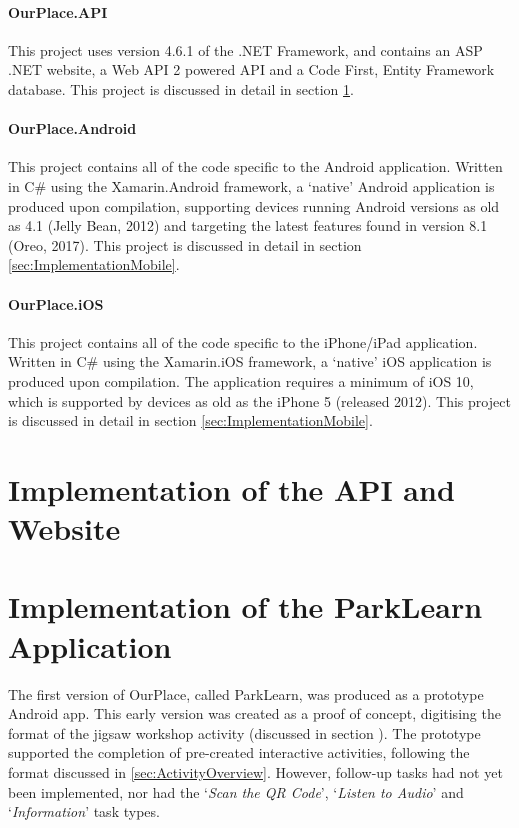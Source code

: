 \paragraph{OurPlace.API}
This project uses version 4.6.1 of the .NET Framework, and contains an ASP .NET
website, a Web API 2 powered API and a Code First, Entity Framework database.
This project is discussed in detail in section \ref{sec:ImplementationWeb}.

\paragraph{OurPlace.Android}
This project contains all of the code specific to the Android application.
Written in C\# using the Xamarin.Android framework, a `native' Android application is
produced upon compilation, supporting devices running Android versions as old as
4.1 (Jelly Bean, 2012) and targeting the latest features found in version 8.1
(Oreo, 2017). This project is discussed in detail in section
\ref{sec:ImplementationMobile}.

\paragraph{OurPlace.iOS}
This project contains all of the code specific to the iPhone/iPad application.
Written in C\# using the Xamarin.iOS framework, a `native' iOS application is
produced upon compilation. The application requires a minimum of iOS 10, which
is supported by devices as old as the iPhone 5 (released 2012). This project is
discussed in detail in section \ref{sec:ImplementationMobile}.

\section{Implementation of the API and Website}
\label{sec:ImplementationWeb}

\section{Implementation of the ParkLearn Application}
\label{sec:ImplementationParkLearn}

The first version of OurPlace, called ParkLearn, was produced as a prototype
Android app. This early version was created as a proof of concept, digitising
the format of the jigsaw workshop activity (discussed in section
). The prototype
supported the completion of pre-created interactive activities, following the
format discussed in \ref{sec:ActivityOverview}. However, follow-up tasks had not
yet been implemented, nor had the `\textit{Scan the QR Code}', `\textit{Listen to
Audio}' and `\textit{Information}' task types.

